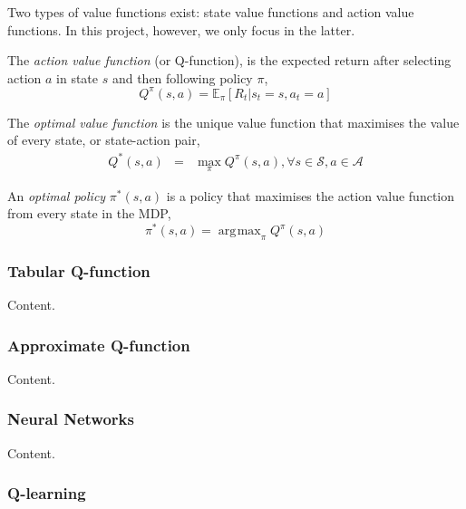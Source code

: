 \documentclass{article}
\DeclareMathOperator*{\argmax}{\arg\!\max}
\begin{document}
Two types of value functions exist: state value functions and action value functions. In this
project, however, we only focus in the latter.

The \emph{action value function} (or Q-function), is the expected return after selecting action $a$
in state $s$ and then following policy $\pi$,
%
\begin{equation}
Q^\pi(s,a) = \mathbb{E}_\pi \left[ R_t | s_t = s, a_t = a \right]
\end{equation}

The \emph{optimal value function} is the unique value function that maximises the value of every
state, or state-action pair,
%
\begin{eqnarray}
Q^*(s,a) & = & \max\limits_\pi Q^\pi(s,a), \forall s \in \mathcal{S}, a \in \mathcal{A}
\end{eqnarray}

An \emph{optimal policy} $\pi^*(s,a)$ is a policy that maximises the action value function from
every state in the MDP,
%
\begin{equation}
    \pi^*(s,a) = \argmax_\pi Q^\pi(s, a)
\end{equation}

\subsubsection{Tabular Q-function}

Content.

\subsubsection{Approximate Q-function}

Content.

\subsubsection{Neural Networks}

Content.

\subsubsection{Q-learning}
\end{document}

